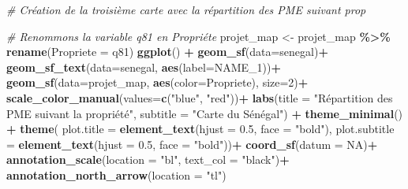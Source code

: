 \documentclass[
]{article}
\newenvironment{Shaded}{\begin{snugshade}}{\end{snugshade}}
\newcommand{\AttributeTok}[1]{\textcolor[rgb]{0.13,0.29,0.53}{#1}}
\newcommand{\CommentTok}[1]{\textcolor[rgb]{0.56,0.35,0.01}{\textit{#1}}}
\newcommand{\ConstantTok}[1]{\textcolor[rgb]{0.56,0.35,0.01}{#1}}
\newcommand{\DecValTok}[1]{\textcolor[rgb]{0.00,0.00,0.81}{#1}}
\newcommand{\FloatTok}[1]{\textcolor[rgb]{0.00,0.00,0.81}{#1}}
\newcommand{\FunctionTok}[1]{\textcolor[rgb]{0.13,0.29,0.53}{\textbf{#1}}}
\newcommand{\NormalTok}[1]{#1}
\newcommand{\OtherTok}[1]{\textcolor[rgb]{0.56,0.35,0.01}{#1}}
\newcommand{\SpecialCharTok}[1]{\textcolor[rgb]{0.81,0.36,0.00}{\textbf{#1}}}
\newcommand{\StringTok}[1]{\textcolor[rgb]{0.31,0.60,0.02}{#1}}
\begin{document}
\begin{Shaded}
\begin{Highlighting}[]
\CommentTok{\# Création de la troisième carte avec la répartition des PME suivant prop}

\CommentTok{\# Renommons la variable q81 en Propriéte}
\NormalTok{projet\_map }\OtherTok{\textless{}{-}}\NormalTok{ projet\_map }\SpecialCharTok{\%\textgreater{}\%} \FunctionTok{rename}\NormalTok{(}\AttributeTok{Propriete =}\NormalTok{ q81)}
\FunctionTok{ggplot}\NormalTok{() }\SpecialCharTok{+}
  \FunctionTok{geom\_sf}\NormalTok{(}\AttributeTok{data=}\NormalTok{senegal)}\SpecialCharTok{+}
  \FunctionTok{geom\_sf\_text}\NormalTok{(}\AttributeTok{data=}\NormalTok{senegal, }\FunctionTok{aes}\NormalTok{(}\AttributeTok{label=}\NormalTok{NAME\_1))}\SpecialCharTok{+}
  \FunctionTok{geom\_sf}\NormalTok{(}\AttributeTok{data=}\NormalTok{projet\_map, }\FunctionTok{aes}\NormalTok{(}\AttributeTok{color=}\NormalTok{Propriete), }\AttributeTok{size=}\DecValTok{2}\NormalTok{)}\SpecialCharTok{+}
  \FunctionTok{scale\_color\_manual}\NormalTok{(}\AttributeTok{values=}\FunctionTok{c}\NormalTok{(}\StringTok{"blue"}\NormalTok{, }\StringTok{"red"}\NormalTok{))}\SpecialCharTok{+}
  \FunctionTok{labs}\NormalTok{(}\AttributeTok{title =} \StringTok{"Répartition des PME suivant la propriété"}\NormalTok{,}
       \AttributeTok{subtitle =} \StringTok{"Carte du Sénégal"}\NormalTok{) }\SpecialCharTok{+}
  \FunctionTok{theme\_minimal}\NormalTok{() }\SpecialCharTok{+}
  \FunctionTok{theme}\NormalTok{(}
    \AttributeTok{plot.title =} \FunctionTok{element\_text}\NormalTok{(}\AttributeTok{hjust =} \FloatTok{0.5}\NormalTok{, }\AttributeTok{face =} \StringTok{"bold"}\NormalTok{),}
    \AttributeTok{plot.subtitle =} \FunctionTok{element\_text}\NormalTok{(}\AttributeTok{hjust =} \FloatTok{0.5}\NormalTok{, }\AttributeTok{face =} \StringTok{"bold"}\NormalTok{))}\SpecialCharTok{+}
  \FunctionTok{coord\_sf}\NormalTok{(}\AttributeTok{datum =} \ConstantTok{NA}\NormalTok{)}\SpecialCharTok{+}
  \FunctionTok{annotation\_scale}\NormalTok{(}\AttributeTok{location =} \StringTok{"bl"}\NormalTok{, }\AttributeTok{text\_col =} \StringTok{"black"}\NormalTok{)}\SpecialCharTok{+}
  \FunctionTok{annotation\_north\_arrow}\NormalTok{(}\AttributeTok{location =} \StringTok{"tl"}\NormalTok{)}
\end{Highlighting}
\end{Shaded}
\end{document}
